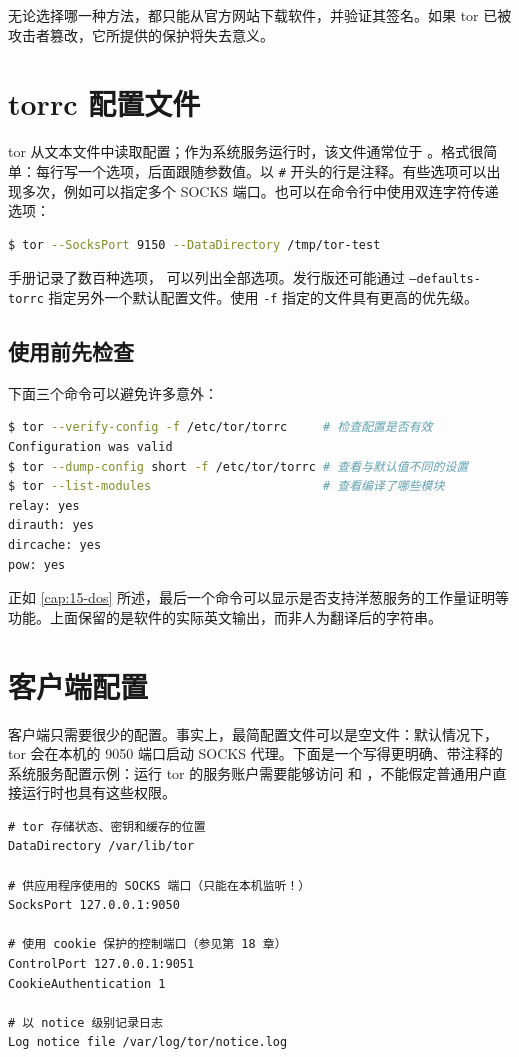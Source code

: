 无论选择哪一种方法，都只能从官方网站下载软件，并验证其签名。如果 tor 已被攻击者篡改，它所提供的保护将失去意义。

\section{torrc 配置文件}\label{sec:torrc-formato}

tor 从文本文件中读取配置；作为系统服务运行时，该文件通常位于 。格式很简单：每行写一个选项，后面跟随参数值。以 \texttt{\#} 开头的行是注释。有些选项可以出现多次，例如可以指定多个 SOCKS 端口。也可以在命令行中使用双连字符传递选项：
\begin{lstlisting}[language=bash,numbers=none]
$ tor --SocksPort 9150 --DataDirectory /tmp/tor-test
\end{lstlisting}
手册记录了数百种选项， 可以列出全部选项。发行版还可能通过 \texttt{--defaults-torrc} 指定另外一个默认配置文件。使用 \texttt{-f} 指定的文件具有更高的优先级。

\subsection{使用前先检查}

下面三个命令可以避免许多意外：
\begin{lstlisting}[language=bash,numbers=none]
$ tor --verify-config -f /etc/tor/torrc     # 检查配置是否有效
Configuration was valid
$ tor --dump-config short -f /etc/tor/torrc # 查看与默认值不同的设置
$ tor --list-modules                        # 查看编译了哪些模块
relay: yes
dirauth: yes
dircache: yes
pow: yes
\end{lstlisting}
正如 \cref{cap:15-dos} 所述，最后一个命令可以显示是否支持洋葱服务的工作量证明等功能。上面保留的是软件的实际英文输出，而非人为翻译后的字符串。

\section{客户端配置}\label{sec:torrc-client}

客户端只需要很少的配置。事实上，最简配置文件可以是空文件：默认情况下，tor 会在本机的 9050 端口启动 SOCKS 代理。下面是一个写得更明确、带注释的系统服务配置示例：运行 tor 的服务账户需要能够访问  和 ，不能假定普通用户直接运行时也具有这些权限。
\begin{lstlisting}[language=torrc]
# tor 存储状态、密钥和缓存的位置
DataDirectory /var/lib/tor

# 供应用程序使用的 SOCKS 端口（只能在本机监听！）
SocksPort 127.0.0.1:9050

# 使用 cookie 保护的控制端口（参见第 18 章）
ControlPort 127.0.0.1:9051
CookieAuthentication 1

# 以 notice 级别记录日志
Log notice file /var/log/tor/notice.log
\end{lstlisting}


